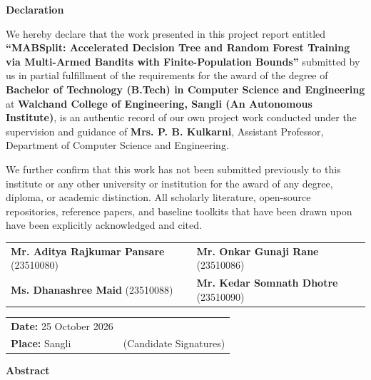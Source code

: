 \documentclass{article}
\begin{document}
	\pagebreak
	\begin{center}
		\Huge \textbf{\color{blue}Declaration} \\
	\end{center}
	\vspace{0.8cm}
	\par 
	\onehalfspacing
    \noindent
We hereby declare that the work presented in this project report entitled \textbf{``MABSplit: Accelerated Decision Tree and Random Forest Training via Multi-Armed Bandits with Finite-Population Bounds''} submitted by us in partial fulfillment of the requirements for the award of the degree of \textbf{Bachelor of Technology (B.Tech) in Computer Science and Engineering} at \textbf{Walchand College of Engineering, Sangli (An Autonomous Institute)}, is an authentic record of our own project work conducted under the supervision and guidance of \textbf{Mrs. P. B. Kulkarni}, Assistant Professor, Department of Computer Science and Engineering.

We further confirm that this work has not been submitted previously to this institute or any other university or institution for the award of any degree, diploma, or academic distinction. All scholarly literature, open-source repositories, reference papers, and baseline toolkits that have been drawn upon have been explicitly acknowledged and cited.

	\vspace{1.8cm}
	\noindent
	\begin{tabular}{p{}p{}}
	\textbf{Mr. Aditya Rajkumar Pansare} (23510080) & \textbf{Mr. Onkar Gunaji Rane} (23510086) \\[0.4in]
	\textbf{Ms. Dhanashree Maid} (23510088) & \textbf{Mr. Kedar Somnath Dhotre} (23510090) \\
	\end{tabular}

	\vspace{1.5cm}
	\noindent
	\begin{tabular}{p{}p{}}
	\textbf{Date:} 25 October 2026 & \\
	\textbf{Place:} Sangli & \flushright (Candidate Signatures)
	\end{tabular}
	
	\pagebreak
	\begin{center}
	\Huge\textbf{\color{blue}Abstract}
	\end{center}
	\vspace{0.5cm}
	
\end{document}

